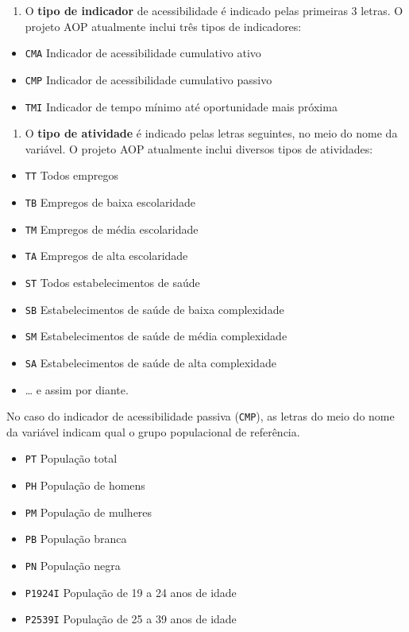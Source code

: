 \documentclass[
  letterpaper,
  DIV=11,
  numbers=noendperiod]{scrreprt}
\providecommand{\tightlist}{%
  \setlength{\itemsep}{0pt}\setlength{\parskip}{0pt}}\usepackage{longtable,booktabs,array}
\begin{document}
\begin{enumerate}
\def\labelenumi{\arabic{enumi})}
\tightlist
\item
  O \textbf{tipo de indicador} de acessibilidade é indicado pelas
  primeiras 3 letras. O projeto AOP atualmente inclui três tipos de
  indicadores:
\end{enumerate}

\begin{itemize}
\tightlist
\item
  \texttt{CMA} Indicador de acessibilidade cumulativo ativo
\item
  \texttt{CMP} Indicador de acessibilidade cumulativo passivo\\
\item
  \texttt{TMI} Indicador de tempo mínimo até oportunidade mais próxima
\end{itemize}

\begin{enumerate}
\def\labelenumi{\arabic{enumi})}
\setcounter{enumi}{1}
\tightlist
\item
  O \textbf{tipo de atividade} é indicado pelas letras seguintes, no
  meio do nome da variável. O projeto AOP atualmente inclui diversos
  tipos de atividades:
\end{enumerate}

\begin{itemize}
\tightlist
\item
  \texttt{TT} Todos empregos
\item
  \texttt{TB} Empregos de baixa escolaridade
\item
  \texttt{TM} Empregos de média escolaridade
\item
  \texttt{TA} Empregos de alta escolaridade
\item
  \texttt{ST} Todos estabelecimentos de saúde
\item
  \texttt{SB} Estabelecimentos de saúde de baixa complexidade
\item
  \texttt{SM} Estabelecimentos de saúde de média complexidade
\item
  \texttt{SA} Estabelecimentos de saúde de alta complexidade
\item
  \ldots{} e assim por diante.
\end{itemize}

No caso do indicador de acessibilidade passiva (\texttt{CMP}), as letras
do meio do nome da variável indicam qual o grupo populacional de
referência.

\begin{itemize}
\tightlist
\item
  \texttt{PT} População total
\item
  \texttt{PH} População de homens
\item
  \texttt{PM} População de mulheres
\item
  \texttt{PB} População branca
\item
  \texttt{PN} População negra
\item
  \texttt{P1924I} População de 19 a 24 anos de idade
\item
  \texttt{P2539I} População de 25 a 39 anos de idade
\end{itemize}
\end{document}
